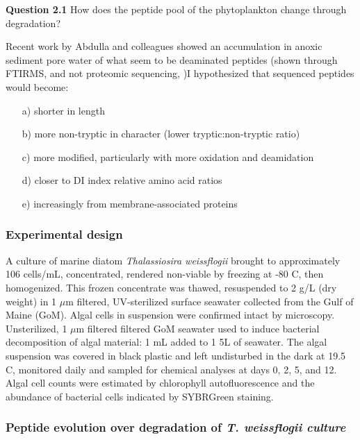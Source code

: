 \documentclass[12pt, letterpaper, twoside]{article}
\begin{document}
\bigskip

\textbf{Question 2.1} How does the peptide pool of the phytoplankton change through degradation?


Recent work by Abdulla and colleagues showed an accumulation in anoxic sediment pore water of what seem to be deaminated peptides (shown through FTIRMS, and not proteomic sequencing, \cite{abdulla_accumulation_2018})I hypothesized that sequenced peptides would become: 

\renewcommand{\labelenumi}{\alph{enumi}}
\begin{enumerate}
	\item[a)] shorter in length
	\item[b)] more non-tryptic in character (lower tryptic:non-tryptic ratio)
	\item[c)] more modified, particularly with more oxidation and deamidation
	\item[d)] closer to DI index relative amino acid ratios
	\item[e)] increasingly from membrane-associated proteins
\end{enumerate}

\subsubsection{Experimental design}

A culture of marine diatom \textit{Thalassiosira weissflogii} brought to approximately 106 cells/mL, concentrated, rendered non-viable by freezing at  -80 C, then homogenized. This frozen concentrate was thawed, resuspended to 2 g/L (dry weight) in 1 $ \mu $m filtered, UV-sterilized surface seawater collected from the Gulf of Maine (GoM). Algal cells in suspension were confirmed intact by microscopy. Unsterilized, 1 $ \mu $m filtered filtered GoM seawater used to induce bacterial decomposition of algal material: 1  mL added to 1 5L of seawater. The algal suspension was covered in black plastic and left undisturbed in the dark at 19.5 C, monitored daily and sampled for chemical analyses at days 0, 2, 5, and 12. Algal cell counts were estimated by chlorophyll autofluorescence and the abundance of bacterial cells indicated by SYBRGreen staining. 


\subsubsection{Peptide evolution over degradation of \textit{T. weissflogii culture}}
\end{document}
